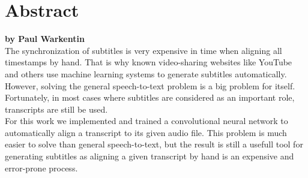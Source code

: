 \chapter*{Abstract}

\textbf{by Paul Warkentin} \\

The synchronization of subtitles is very expensive in time when aligning all timestamps by hand. That is why known video-sharing websites like YouTube and others use machine learning systems to generate subtitles automatically. However, solving the general speech-to-text problem is a big problem for itself. Fortunately, in most cases where subtitles are considered as an important role, transcripts are still be used. \\

For this work we implemented and trained a convolutional neural network to automatically align a transcript to its given audio file. This problem is much easier to solve than general speech-to-text, but the result is still a usefull tool for generating subtitles as aligning a given transcript by hand is an expensive and error-prone process.
